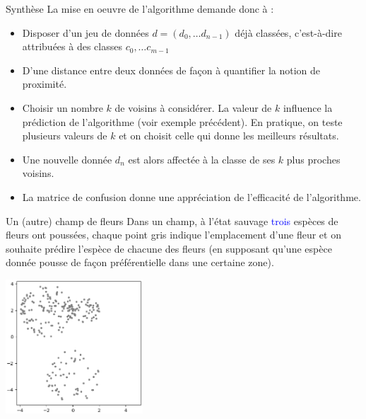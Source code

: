 \documentclass[10pt]{beamer}
\begin{document}
\begin{frame}{\Ctitle}{\stitle}
    \begin{block}{Synthèse}
        La mise en oeuvre de l'algorithme demande donc à :
        \begin{itemize}
            \item<1-> Disposer d'un jeu de données $d=(d_0, \dots d_{n-1})$ déjà classées, c'est-à-dire attribuées à des classes $c_0, \dots c_{m-1}$
            \item<2-> D'une distance entre deux données de façon à quantifier la notion de proximité.
            \item<3-> Choisir un nombre $k$ de voisins à considérer. La valeur de $k$ influence la prédiction de l'algorithme (voir exemple précédent). En pratique, on teste plusieurs valeurs de $k$ et on choisit celle qui donne les meilleurs résultats.
            \item<4-> Une nouvelle donnée $d_n$ est alors affectée à la classe de ses $k$ plus proches voisins.
            \item<5-> La matrice de confusion donne une appréciation de l'efficacité de l'algorithme.
        \end{itemize}
    \end{block}
\end{frame}



\begin{frame}{\Ctitle}{\stitle}
    \begin{exampleblock}{Un (autre) champ de fleurs}
        Dans un champ, à l'état sauvage \textcolor{blue}{trois} espèces de fleurs ont poussées, chaque point gris indique l'emplacement d'une fleur et on souhaite prédire l'espèce de chacune des fleurs (en supposant qu'une espèce donnée pousse de façon préférentielle dans une certaine zone).
        \begin{center}
            \includegraphics[height=5cm]{start_kmeans.eps}
        \end{center}
    \end{exampleblock}
\end{frame}
\end{document}
